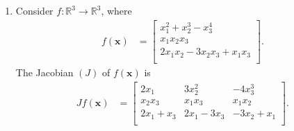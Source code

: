\documentclass[a4paper,11pt]{article}
\newcommand{\ds}{\displaystyle}
\begin{document}
{{\begin{enumerate}[leftmargin=*]
\begin{enumerate}[label=\alph*)]
			\item Let $\ds{f(x_1,x_2) = x_1x_2 + x_1^3 -3}$. The domain of $\ds{f}$ is the set  $\ds{D = \mathbb{R}^2}$. The range of $\ds{f}$ is the set $\ds{S = \mathbb{R}}$. Considering the Gradient $\ds{(\nabla)}$ and Hessian $\ds{(H)}$ of $\ds{f(\mathbf{x})}$, 
				\begin{align*}
					\nabla f(\mathbf{x}) & = 
					\begin{bmatrix}
						x_2 + 3x_1^2 \\
						x_1 \\
					\end{bmatrix}, \\
					Hf(\mathbf{x}) & = 
					\begin{bmatrix}
						6x_1 & 1 \\
						1 & 0 \\
					\end{bmatrix}.
				\end{align*}
				Both the Gradient and Hessian of $\ds{f(\mathbf{x})}$ have domain $\ds{D = \mathbb{R}^2}$. The Gradient has range 
				\begin{align*} S & = \left\{A \in M_{2,1}(\mathbb{R}) : A =
						\begin{bmatrix}
							a \\
							b \\
						\end{bmatrix},
					a,b \in \mathbb{R} \right\}.
				\end{align*}
				The Hessian has range
				\begin{align*} S & = \left\{A \in M_{2,2}(\mathbb{R}) : A =
						\begin{bmatrix}
							a & 1 \\
							1 & 0 \\
						\end{bmatrix},
					a \in \mathbb{R} \right\}.
				\end{align*}
		\end{enumerate}

		\item Consider $\ds{f:\mathbb{R}^3 \rightarrow \mathbb{R}^3}$, where 
			\begin{align*}
				f(\mathbf{x}) & = 
				\begin{bmatrix}
					x_1^2 + x_2^3 - x_3^4 \\
					x_1x_2x_3 \\
					2x_1x_2 - 3x_2x_3 + x_1x_3 \\
				\end{bmatrix}.
			\end{align*}
			The Jacobian $\ds{(J)}$ of $\ds{f(\mathbf{x})}$ is 
			\begin{align*}
				Jf(\mathbf{x}) & = 
				\begin{bmatrix}
					2x_1 & 3x_2^2 & -4x_3^3 \\
					x_2x_3 & x_1x_3 & x_1x_2 \\
					2x_1 + x_3 & 2x_1 - 3x_3 & -3x_2 + x_1 \\
				\end{bmatrix}.
			\end{align*}


\end{enumerate}}}
\end{document}
